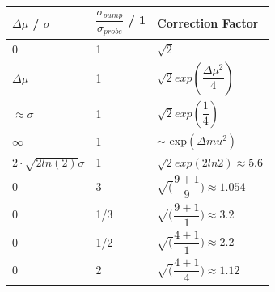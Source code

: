 \documentclass[twoside,openright]{scrreprt}
\begin{document}
\begin{table}[h]
\begin{tabular}{lll}
$\Delta \mu$ / $\sigma$               & $\dfrac{\sigma_{pump}}{\sigma_{probe}}$ / 1 & Correction Factor                                                                                                \\ \hline
0                                     & 1                                           & $\sqrt{2}$                                                                                                        \\
$\Delta\mu$                           & 1                                           & $\sqrt{2} exp \left( \dfrac{\Delta \mu ^2}{4}\right)$                                                             \\
$\approx \sigma$                      & 1                                           & $\sqrt{2}exp\left(\dfrac{1}{4}\right)$                                                                            \\
$\infty$ & 1                                           & $\sim$ exp$\left(\Delta mu ^2 \right)$ \\
$2\cdot\sqrt{2 ln(2)}\sigma$       & 1                                           & $\sqrt{2}exp(2ln2)\approx 5.6$                                                                                    \\
0                                     & 3                                           & $\sqrt(\dfrac{9+1}{9}) \approx 1.054$                                                                             \\
0                                     & 1/3                                         & $\sqrt(\dfrac{9+1}{1}) \approx 3.2$                                                                               \\
0                                     & 1/2                                         & $\sqrt(\dfrac{4+1}{1}) \approx 2.2$                                                                               \\
0                                     & 2                                           & $\sqrt(\dfrac{4+1}{4}) \approx 1.12$                                                                             
\end{tabular}
\end{table}
\end{document}
